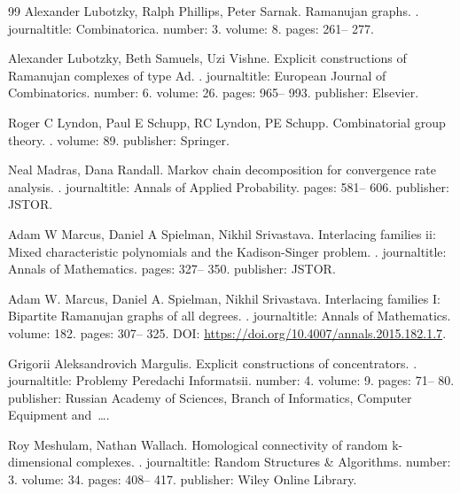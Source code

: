 \documentclass[10pt,a4paper]{article}
\theoremstyle{definition}
\theoremstyle{remark}
\numberwithin{equation}{section}
\begin{document}
\begin{thebibliography}{99}
Alexander Lubotzky, Ralph Phillips, Peter Sarnak.
\newblock Ramanujan graphs.
.
\newblock journaltitle: Combinatorica.
\newblock number: 3.
\newblock volume: 8.
\newblock pages: 261-- 277.

Alexander Lubotzky, Beth Samuels, Uzi Vishne.
\newblock Explicit constructions of Ramanujan complexes of type Ad.
.
\newblock journaltitle: European Journal of Combinatorics.
\newblock number: 6.
\newblock volume: 26.
\newblock pages: 965-- 993.
\newblock publisher: Elsevier.

Roger C Lyndon, Paul E Schupp, RC Lyndon, PE Schupp.
\newblock Combinatorial group theory.
.
\newblock volume: 89.
\newblock publisher: Springer.

Neal Madras, Dana Randall.
\newblock Markov chain decomposition for convergence rate analysis.
.
\newblock journaltitle: Annals of Applied Probability.
\newblock pages: 581-- 606.
\newblock publisher: JSTOR.

Adam W Marcus, Daniel A Spielman, Nikhil Srivastava.
\newblock Interlacing families ii: Mixed characteristic polynomials and the {K}adison-{S}inger problem.
.
\newblock journaltitle: Annals of Mathematics.
\newblock pages: 327-- 350.
\newblock publisher: JSTOR.

Adam W. Marcus, Daniel A. Spielman, Nikhil Srivastava.
\newblock Interlacing families I: Bipartite Ramanujan graphs of all degrees.
.
\newblock journaltitle: Annals of Mathematics.
\newblock volume: 182.
\newblock pages: 307-- 325.
\newblock DOI: \url{https://doi.org/10.4007/annals.2015.182.1.7}.

Grigorii Aleksandrovich Margulis.
\newblock Explicit constructions of concentrators.
.
\newblock journaltitle: Problemy Peredachi Informatsii.
\newblock number: 4.
\newblock volume: 9.
\newblock pages: 71-- 80.
\newblock publisher: Russian Academy of Sciences, Branch of Informatics, Computer Equipment and~….

Roy Meshulam, Nathan Wallach.
\newblock Homological connectivity of random k-dimensional complexes.
.
\newblock journaltitle: Random Structures \& Algorithms.
\newblock number: 3.
\newblock volume: 34.
\newblock pages: 408-- 417.
\newblock publisher: Wiley Online Library.


\end{thebibliography}
\end{document}
